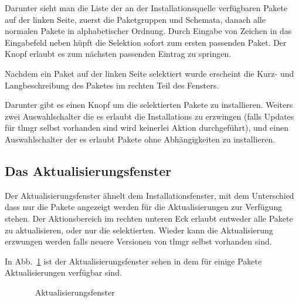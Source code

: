 Darunter sieht man die Liste der an der Installationsquelle verfügbaren
Pakete auf der linken Seite, zuerst die Paketgruppen und Schemata, danach
alle normalen Pakete in alphabetischer Ordnung. Durch Eingabe von Zeichen
in das Eingabefeld neben  hüpft die Selektion sofort zum ersten
passenden Paket. Der Knopf  erlaubt es zum nächsten
passenden Eintrag zu springen. 

Nachdem ein Paket auf der linken Seite selektiert wurde erscheint die
Kurz- und Langbeschreibung des Paketes im rechten Teil des Fensters.

Darunter gibt es einen Knopf um die selektierten Pakete zu installieren.
Weiters zwei Auswahlschalter die es erlaubt die Installations zu
erzwingen (falls Updates für tlmgr selbst vorhanden sind wird keinerlei
Aktion durchgeführt), und einen Auswahlschalter der es erlaubt Pakete
ohne Abhängigkeiten zu installieren.

\subsection{Das Aktualisierungsfenster}

Der Aktualisierungsfenster ähnelt dem Installationsfenster, mit dem
Unterschied dass nur die Pakete angezeigt werden für die Aktualisierungen
zur Verfügung stehen. Der Aktionsbereich im rechten unteren Eck erlaubt
entweder alle Pakete zu aktualisieren, oder nur die selektierten.
Wieder kann die Aktualisierung erzwungen werden falls neuere Versionen
von tlmgr selbst vorhanden sind.

In Abb.~\ref{fig:gui:update} ist der Aktualisierungsfenster sehen in dem für
einige Pakete Aktualisierungen verfügbar sind.

\begin{figure}[ht!]
  \centering
  \caption{\tlmgr\  Aktualisierungsfenster}
  \label{fig:gui:update}
\end{figure}

